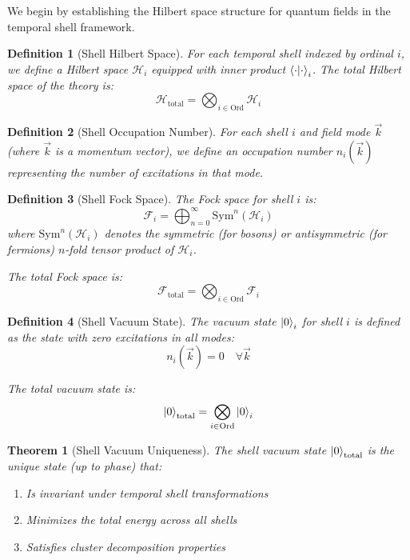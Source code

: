 \documentclass[12pt,a4paper]{article}
\newtheorem{theorem}{Theorem}[section]
\newtheorem{definition}{Definition}[section]
\newcommand{\F}{\mathcal{F}}
\newcommand{\Hilbert}{\mathcal{H}}
\begin{document}
We begin by establishing the Hilbert space structure for quantum fields in the temporal shell framework.

\begin{definition}[Shell Hilbert Space]
\label{def:shell-hilbert}
For each temporal shell indexed by ordinal $i$, we define a Hilbert space $\Hilbert_i$ equipped with inner product $\braket{\cdot}{\cdot}_i$. The total Hilbert space of the theory is:
\begin{equation}
\Hilbert_{\text{total}} = \bigotimes_{i \in \text{Ord}} \Hilbert_i
\end{equation}
\end{definition}

\begin{definition}[Shell Occupation Number]
\label{def:occupation-number}
For each shell $i$ and field mode $\vec{k}$ (where $\vec{k}$ is a momentum vector), we define an occupation number $n_i(\vec{k})$ representing the number of excitations in that mode.
\end{definition}

\begin{definition}[Shell Fock Space]
\label{def:fock-space}
The Fock space for shell $i$ is:
\begin{equation}
\F_i = \bigoplus_{n=0}^{\infty} \text{Sym}^n(\Hilbert_i)
\end{equation}
where $\text{Sym}^n(\Hilbert_i)$ denotes the symmetric (for bosons) or antisymmetric (for fermions) $n$-fold tensor product of $\Hilbert_i$.

The total Fock space is:
\begin{equation}
\F_{\text{total}} = \bigotimes_{i \in \text{Ord}} \F_i
\end{equation}
\end{definition}

\begin{definition}[Shell Vacuum State]
\label{def:vacuum-state}
The vacuum state $\ket{0}_i$ for shell $i$ is defined as the state with zero excitations in all modes:
\begin{equation}
n_i(\vec{k}) = 0 \quad \forall \vec{k}
\end{equation}

The total vacuum state is:
\begin{equation}
\ket{0}_{\text{total}} = \bigotimes_{i \in \text{Ord}} \ket{0}_i
\end{equation}
\end{definition}

\begin{theorem}[Shell Vacuum Uniqueness]
\label{thm:vacuum-uniqueness}
The shell vacuum state $\ket{0}_{\text{total}}$ is the unique state (up to phase) that:
\begin{enumerate}
    \item Is invariant under temporal shell transformations
    \item Minimizes the total energy across all shells
    \item Satisfies cluster decomposition properties
\end{enumerate}
\end{theorem}
\end{document}
